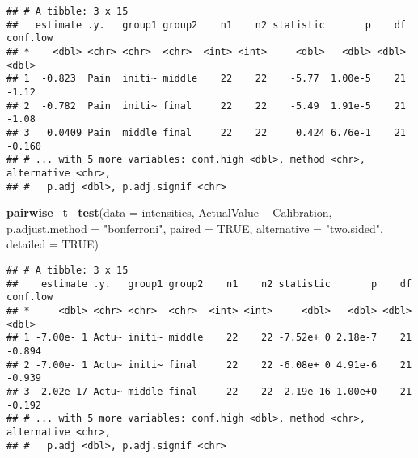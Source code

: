 \documentclass[
]{article}
\newenvironment{Shaded}{\begin{snugshade}}{\end{snugshade}}
\newcommand{\DataTypeTok}[1]{\textcolor[rgb]{0.13,0.29,0.53}{#1}}
\newcommand{\KeywordTok}[1]{\textcolor[rgb]{0.13,0.29,0.53}{\textbf{#1}}}
\newcommand{\NormalTok}[1]{#1}
\newcommand{\OperatorTok}[1]{\textcolor[rgb]{0.81,0.36,0.00}{\textbf{#1}}}
\newcommand{\OtherTok}[1]{\textcolor[rgb]{0.56,0.35,0.01}{#1}}
\newcommand{\StringTok}[1]{\textcolor[rgb]{0.31,0.60,0.02}{#1}}
\begin{document}
\begin{verbatim}
## # A tibble: 3 x 15
##   estimate .y.   group1 group2    n1    n2 statistic       p    df conf.low
## *    <dbl> <chr> <chr>  <chr>  <int> <int>     <dbl>   <dbl> <dbl>    <dbl>
## 1  -0.823  Pain  initi~ middle    22    22    -5.77  1.00e-5    21   -1.12 
## 2  -0.782  Pain  initi~ final     22    22    -5.49  1.91e-5    21   -1.08 
## 3   0.0409 Pain  middle final     22    22     0.424 6.76e-1    21   -0.160
## # ... with 5 more variables: conf.high <dbl>, method <chr>, alternative <chr>,
## #   p.adj <dbl>, p.adj.signif <chr>
\end{verbatim}

\begin{Shaded}
\begin{Highlighting}[]
\KeywordTok{pairwise_t_test}\NormalTok{(}\DataTypeTok{data =}\NormalTok{ intensities, ActualValue }\OperatorTok{~}\StringTok{ }\NormalTok{Calibration, }\DataTypeTok{p.adjust.method =} \StringTok{"bonferroni"}\NormalTok{, }\DataTypeTok{paired =} \OtherTok{TRUE}\NormalTok{, }\DataTypeTok{alternative =} \StringTok{"two.sided"}\NormalTok{, }\DataTypeTok{detailed =} \OtherTok{TRUE}\NormalTok{)}
\end{Highlighting}
\end{Shaded}

\begin{verbatim}
## # A tibble: 3 x 15
##    estimate .y.   group1 group2    n1    n2 statistic       p    df conf.low
## *     <dbl> <chr> <chr>  <chr>  <int> <int>     <dbl>   <dbl> <dbl>    <dbl>
## 1 -7.00e- 1 Actu~ initi~ middle    22    22 -7.52e+ 0 2.18e-7    21   -0.894
## 2 -7.00e- 1 Actu~ initi~ final     22    22 -6.08e+ 0 4.91e-6    21   -0.939
## 3 -2.02e-17 Actu~ middle final     22    22 -2.19e-16 1.00e+0    21   -0.192
## # ... with 5 more variables: conf.high <dbl>, method <chr>, alternative <chr>,
## #   p.adj <dbl>, p.adj.signif <chr>
\end{verbatim}
\end{document}

